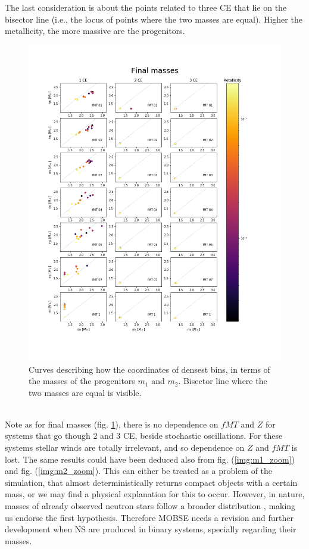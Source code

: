 \documentclass[preprint,12pt]{elsarticle}
\begin{document}
The last consideration is about the points related to three CE that lie on the bisector line (i.e., the locus of points where the two masses are equal). Higher the metallicity, the more massive are the progenitors. 

\begin{figure}[htp]
    \centering
    \includegraphics[width=1\textwidth]{Images/center_densities_final.png}
    \caption{Curves describing how the coordinates of densest bins, in terms of the masses of the progenitors $m_1$ and $m_2$. Bisector line where the two masses are equal is visible.}
    \label{img:final_masses_densest_bin}
  \end{figure}

\\

Note as for final masses (fig. \ref{img:final_masses_densest_bin}), there is no dependence on $fMT$ and $Z$ for systems that go though 2 and 3 CE, beside stochastic oscillations. For these systems stellar winds are totally irrelevant, and so dependence on $Z$ and $fMT$ is lost. The same results could have been deduced also from fig. (\ref{img:m1_zoom}) and fig. (\ref{img:m2_zoom}). This can either be treated as a problem of the simulation, that almost deterministically returns compact objects with a certain mass, or we may find a physical explanation for this to occur. However, in nature, masses of already observed neutron stars follow a broader distribution \citep{Farrow_2019}, making us endorse the first hypothesis. Therefore MOBSE needs a revision and further development when NS are produced in binary systems, specially regarding their masses.\\
\end{document}
